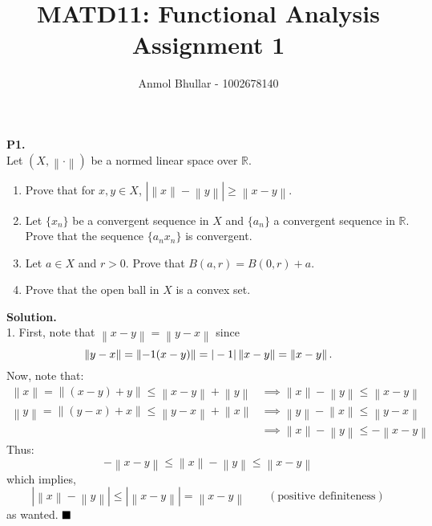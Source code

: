 \documentclass{article}
\title{MATD11: Functional Analysis \\
    Assignment 1}
\author{Anmol Bhullar - 1002678140}
\newcommand{\norm}[1]{\left\lVert#1\right\rVert}
\begin{document}
    \maketitle

    \textbf{P1.}\\

    Let $(X,\norm{\cdot})$ be a normed linear space over $\mathbb{R}$.
    \begin{enumerate}
        \item Prove that for $x,y\in X$, $|\norm{x}-\norm{y}|\geq\norm{x-y}$.
        \item Let $\{x_n\}$ be a convergent sequence in $X$ and $\{a_n\}$ a convergent sequence in $\mathbb{R}$. Prove that
            the sequence $\{a_nx_n\}$ is convergent.
        \item Let $a\in X$ and $r>0$. Prove that $B(a,r) = B(0,r) + a$.
        \item Prove that the open ball in $X$ is a convex set.
    \end{enumerate}

    \textbf{Solution.}\\
    
    1. First, note that $\norm{x-y} = \norm{y-x}$ since 
    \[ \norm{y-x} = \norm{-1(x-y)} =\\ |-1|\norm{x-y} = \norm{x-y}. \] 
    Now, note that:
    \begin{align*}
        \norm{x} = \norm{(x-y)+y} \leq \norm{x-y} + \norm{y} &\implies \norm{x}-\norm{y} \leq \norm{x-y}\\
        \norm{y} = \norm{(y-x)+x} \leq \norm{y-x} + \norm{x} &\implies \norm{y}-\norm{x} \leq \norm{y-x}\\
        &\implies \norm{x}-\norm{y} \leq -\norm{x-y}
    \end{align*}
    Thus:
    \[ -\norm{x-y} \leq \norm{x}-\norm{y} \leq \norm{x-y} \]
    which implies,
    \[ |\norm{x}-\norm{y}|\leq |\norm{x-y}| = \norm{x-y}\qquad (\text{positive definiteness}) \]
    as wanted. $\hfill\blacksquare$\\
\end{document}
